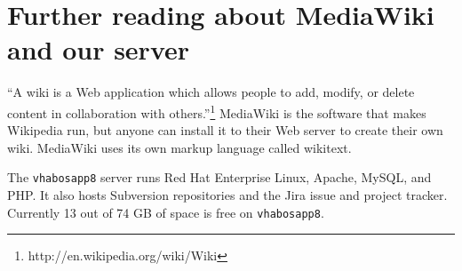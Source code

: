 \documentclass{tufte-handout}
\begin{document}
\section{Further reading about MediaWiki and our server}

``A wiki is a Web application which allows people to add, modify, or
delete content in collaboration with
others.''\footnote{http://en.wikipedia.org/wiki/Wiki} MediaWiki is the
software that makes Wikipedia run, but anyone can install it to their
Web server to create their own wiki. MediaWiki uses its own markup
language called wikitext.

The \texttt{vhabosapp8} server runs Red Hat Enterprise Linux, Apache,
MySQL, and PHP. It also hosts Subversion repositories and the Jira
issue and project tracker. Currently 13 out of 74 GB of space is free
on \texttt{vhabosapp8}.
\end{document}
